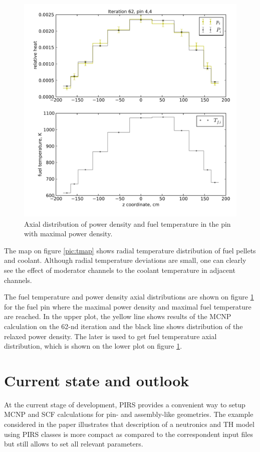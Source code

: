 \documentclass[a4paper,10pt,twocolumn,english]{sphinxsnamc2013}
\begin{document}
\begin{figure}[htbp]
\centering
\capstart

\includegraphics{b_iteration_062_4_4.pdf}
\caption{Axial distribution of power density and fuel temperature in the pin with
maximal power density. \label{pic:axial}}\end{figure}

The map on figure \ref{pic:tmap} shows radial temperature distribution of
fuel pellets and coolant. Although radial temperature
deviations are small, one can clearly see the effect of moderator channels to
the coolant temperature in adjacent channels.

The fuel temperature and power density axial distributions are shown on figure
\ref{pic:axial} for the fuel pin where the maximal power density
and maximal fuel temperature are reached. In the upper plot, the yellow line
shows results of the MCNP calculation on the 62-nd iteration and the black
line shows distribution of the relaxed power density. The later is used to get
fuel temperature axial distribution, which is shown on the lower plot on figure
\ref{pic:axial}.


\section{Current state  and outlook}
\label{paper:current-state-and-outlook}
At the current stage of development, PIRS provides a convenient way to setup
MCNP and SCF calculations for pin- and assembly-like geometries. The example
considered in the paper illustrates that description of a neutronics and TH
model using PIRS classes is more compact as compared to the correspondent input
files but still allows to set all relevant parameters.
\end{document}
